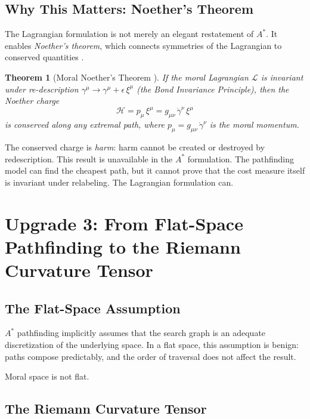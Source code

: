 \documentclass[12pt]{article}
\newtheorem{theorem}{Theorem}[section]
\theoremstyle{definition}
\theoremstyle{remark}
\newcommand{\Lag}{\mathcal{L}}
\begin{document}
\subsection{Why This Matters: Noether's Theorem}

The Lagrangian formulation is not merely an elegant restatement of $A^*$. It enables \emph{Noether's theorem}, which connects symmetries of the Lagrangian to conserved quantities \citep{noether1918}.

\begin{theorem}[Moral Noether's Theorem {\citep[Theorem 11.1]{anonymous2026ge}}]
If the moral Lagrangian $\Lag$ is invariant under re-description $\gamma^\mu \to \gamma^\mu + \epsilon\, \xi^\mu$ (the Bond Invariance Principle), then the Noether charge
\begin{equation}
\mathcal{H} = p_\mu\, \xi^\mu = g_{\mu\nu}\, \dot{\gamma}^\nu\, \xi^\mu
\end{equation}
is conserved along any extremal path, where $p_\mu = g_{\mu\nu}\, \dot{\gamma}^\nu$ is the moral momentum.
\end{theorem}

The conserved charge is \emph{harm}: harm cannot be created or destroyed by redescription. This result is unavailable in the $A^*$ formulation. The pathfinding model can find the cheapest path, but it cannot prove that the cost measure itself is invariant under relabeling. The Lagrangian formulation can.


\section{Upgrade 3: From Flat-Space Pathfinding to the Riemann Curvature Tensor}
\label{sec:curvature}

\subsection{The Flat-Space Assumption}

$A^*$ pathfinding implicitly assumes that the search graph is an adequate discretization of the underlying space. In a flat space, this assumption is benign: paths compose predictably, and the order of traversal does not affect the result.

Moral space is not flat.

\subsection{The Riemann Curvature Tensor}
\end{document}
